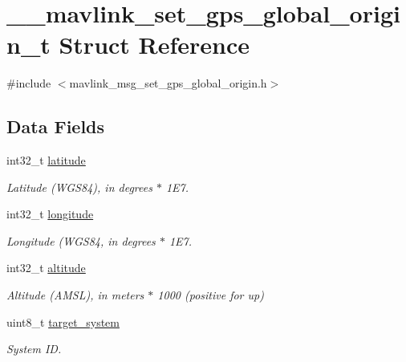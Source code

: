 \hypertarget{struct____mavlink__set__gps__global__origin__t}{\section{\+\_\+\+\_\+mavlink\+\_\+set\+\_\+gps\+\_\+global\+\_\+origin\+\_\+t Struct Reference}
\label{struct____mavlink__set__gps__global__origin__t}
}


{\ttfamily \#include $<$mavlink\+\_\+msg\+\_\+set\+\_\+gps\+\_\+global\+\_\+origin.\+h$>$}

\subsection*{Data Fields}
\begin{DoxyCompactItemize}
\item 
int32\+\_\+t \hyperlink{struct____mavlink__set__gps__global__origin__t_aae0adf1cfbd99eef18d9d43fdb0418dd}{latitude}
\begin{DoxyCompactList}\small\item\em Latitude (W\+G\+S84), in degrees $\ast$ 1\+E7. \end{DoxyCompactList}\item 
int32\+\_\+t \hyperlink{struct____mavlink__set__gps__global__origin__t_a1558c474ba2b7f246bb22f170677f4d3}{longitude}
\begin{DoxyCompactList}\small\item\em Longitude (W\+G\+S84, in degrees $\ast$ 1\+E7. \end{DoxyCompactList}\item 
int32\+\_\+t \hyperlink{struct____mavlink__set__gps__global__origin__t_ae86e137844aafd0a7fc6502b355cd0a2}{altitude}
\begin{DoxyCompactList}\small\item\em Altitude (A\+M\+S\+L), in meters $\ast$ 1000 (positive for up) \end{DoxyCompactList}\item 
uint8\+\_\+t \hyperlink{struct____mavlink__set__gps__global__origin__t_a8b0950dbed98f3f0515bb5726bc5184c}{target\+\_\+system}
\begin{DoxyCompactList}\small\item\em System I\+D. \end{DoxyCompactList}\end{DoxyCompactItemize}


